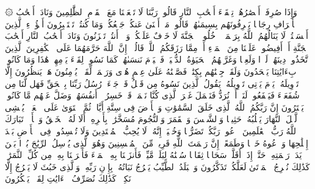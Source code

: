 \startbuffer[\q:7:47]
۞ وَإِذَا صُرِفَتۡ أَبۡصَٰرُهُمۡ تِلۡقَاۤءَ أَصۡحَٰبِ ٱلنَّارِ قَالُوا۟ رَبَّنَا لَا تَجۡعَلۡنَا مَعَ ٱلۡقَوۡمِ ٱلظَّٰلِمِینَ%
\stopbuffer%
\startbuffer[\q:7:48]
وَنَادَىٰۤ أَصۡحَٰبُ ٱلۡأَعۡرَافِ رِجَالࣰا یَعۡرِفُونَهُم بِسِیمَىٰهُمۡ قَالُوا۟ مَاۤ أَغۡنَىٰ عَنكُمۡ جَمۡعُكُمۡ وَمَا كُنتُمۡ تَسۡتَكۡبِرُونَ%
\stopbuffer%
\startbuffer[\q:7:49]
أَهَٰۤؤُلَاۤءِ ٱلَّذِینَ أَقۡسَمۡتُمۡ لَا یَنَالُهُمُ ٱللَّهُ بِرَحۡمَةٍۚ ٱدۡخُلُوا۟ ٱلۡجَنَّةَ لَا خَوۡفٌ عَلَیۡكُمۡ وَلَاۤ أَنتُمۡ تَحۡزَنُونَ%
\stopbuffer%
\startbuffer[\q:7:50]
وَنَادَىٰۤ أَصۡحَٰبُ ٱلنَّارِ أَصۡحَٰبَ ٱلۡجَنَّةِ أَنۡ أَفِیضُوا۟ عَلَیۡنَا مِنَ ٱلۡمَاۤءِ أَوۡ مِمَّا رَزَقَكُمُ ٱللَّهُۚ قَالُوۤا۟ إِنَّ ٱللَّهَ حَرَّمَهُمَا عَلَى ٱلۡكَٰفِرِینَ%
\stopbuffer%
\startbuffer[\q:7:51]
ٱلَّذِینَ ٱتَّخَذُوا۟ دِینَهُمۡ لَهۡوࣰا وَلَعِبࣰا وَغَرَّتۡهُمُ ٱلۡحَیَوٰةُ ٱلدُّنۡیَاۚ فَٱلۡیَوۡمَ نَنسَىٰهُمۡ كَمَا نَسُوا۟ لِقَاۤءَ یَوۡمِهِمۡ هَٰذَا وَمَا كَانُوا۟ بِءَایَٰتِنَا یَجۡحَدُونَ%
\stopbuffer%
\startbuffer[\q:7:52]
وَلَقَدۡ جِئۡنَٰهُم بِكِتَٰبࣲ فَصَّلۡنَٰهُ عَلَىٰ عِلۡمٍ هُدࣰى وَرَحۡمَةࣰ لِّقَوۡمࣲ یُؤۡمِنُونَ%
\stopbuffer%
\startbuffer[\q:7:53]
هَلۡ یَنظُرُونَ إِلَّا تَأۡوِیلَهُۥۚ یَوۡمَ یَأۡتِی تَأۡوِیلُهُۥ یَقُولُ ٱلَّذِینَ نَسُوهُ مِن قَبۡلُ قَدۡ جَاۤءَتۡ رُسُلُ رَبِّنَا بِٱلۡحَقِّ فَهَل لَّنَا مِن شُفَعَاۤءَ فَیَشۡفَعُوا۟ لَنَاۤ أَوۡ نُرَدُّ فَنَعۡمَلَ غَیۡرَ ٱلَّذِی كُنَّا نَعۡمَلُۚ قَدۡ خَسِرُوۤا۟ أَنفُسَهُمۡ وَضَلَّ عَنۡهُم مَّا كَانُوا۟ یَفۡتَرُونَ%
\stopbuffer%
\startbuffer[\q:7:54]
إِنَّ رَبَّكُمُ ٱللَّهُ ٱلَّذِی خَلَقَ ٱلسَّمَٰوَٰتِ وَٱلۡأَرۡضَ فِی سِتَّةِ أَیَّامࣲ ثُمَّ ٱسۡتَوَىٰ عَلَى ٱلۡعَرۡشِۖ یُغۡشِی ٱلَّیۡلَ ٱلنَّهَارَ یَطۡلُبُهُۥ حَثِیثࣰا وَٱلشَّمۡسَ وَٱلۡقَمَرَ وَٱلنُّجُومَ مُسَخَّرَٰتِۭ بِأَمۡرِهِۦۤۗ أَلَا لَهُ ٱلۡخَلۡقُ وَٱلۡأَمۡرُۗ تَبَارَكَ ٱللَّهُ رَبُّ ٱلۡعَٰلَمِینَ%
\stopbuffer%
\startbuffer[\q:7:55]
ٱدۡعُوا۟ رَبَّكُمۡ تَضَرُّعࣰا وَخُفۡیَةًۚ إِنَّهُۥ لَا یُحِبُّ ٱلۡمُعۡتَدِینَ%
\stopbuffer%
\startbuffer[\q:7:56]
وَلَا تُفۡسِدُوا۟ فِی ٱلۡأَرۡضِ بَعۡدَ إِصۡلَٰحِهَا وَٱدۡعُوهُ خَوۡفࣰا وَطَمَعًاۚ إِنَّ رَحۡمَتَ ٱللَّهِ قَرِیبࣱ مِّنَ ٱلۡمُحۡسِنِینَ%
\stopbuffer%
\startbuffer[\q:7:57]
وَهُوَ ٱلَّذِی یُرۡسِلُ ٱلرِّیَٰحَ بُشۡرَۢا بَیۡنَ یَدَیۡ رَحۡمَتِهِۦۖ حَتَّىٰۤ إِذَاۤ أَقَلَّتۡ سَحَابࣰا ثِقَالࣰا سُقۡنَٰهُ لِبَلَدࣲ مَّیِّتࣲ فَأَنزَلۡنَا بِهِ ٱلۡمَاۤءَ فَأَخۡرَجۡنَا بِهِۦ مِن كُلِّ ٱلثَّمَرَٰتِۚ كَذَٰلِكَ نُخۡرِجُ ٱلۡمَوۡتَىٰ لَعَلَّكُمۡ تَذَكَّرُونَ%
\stopbuffer%
\startbuffer[\q:7:58]
وَٱلۡبَلَدُ ٱلطَّیِّبُ یَخۡرُجُ نَبَاتُهُۥ بِإِذۡنِ رَبِّهِۦۖ وَٱلَّذِی خَبُثَ لَا یَخۡرُجُ إِلَّا نَكِدࣰاۚ كَذَٰلِكَ نُصَرِّفُ ٱلۡءَایَٰتِ لِقَوۡمࣲ یَشۡكُرُونَ%
\stopbuffer%
\startbuffer[\q:7:59]
